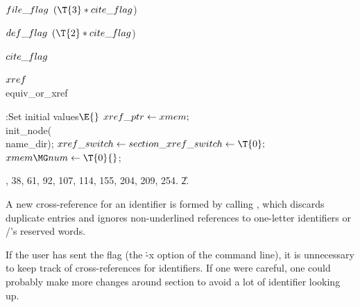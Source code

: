 \Y\B\4\D$\\{file\_flag}$ \5
$(\T{3}*\\{cite\_flag}{}$)\par
\B\4\D$\\{def\_flag}$ \5
$(\T{2}*\\{cite\_flag}{}$)\par
\B\4\D$\\{cite\_flag}$ \5
\par
\B\4\D$\\{xref}$ \5
\\{equiv\_or\_xref}\par
\Y\B\4:Set initial values\X${}\E{}$\6
$\\{xref\_ptr}\leftarrow\\{xmem};{}$\6
\\{init\_node}(\\{name\_dir});\6
${}\\{xref\_switch}\K\\{section\_xref\_switch}\K\T{0};{}$\6
${}\\{xmem}\MG\\{num}\K\T{0}{}$;\par
{}, 38, 61, 92, 107, 114, 155, 204, 209, 254.
\U2.\fi

A new cross-reference for an identifier is formed by calling ,
which discards duplicate entries and ignores non-underlined references
to one-letter identifiers or \CEE/'s reserved words.

If the user has sent the  flag (the \.{-x} option of the
command line),
it is unnecessary to keep track of cross-references for identifiers.
If one were careful, one could probably make more changes around section
 to avoid a lot of identifier looking up.

